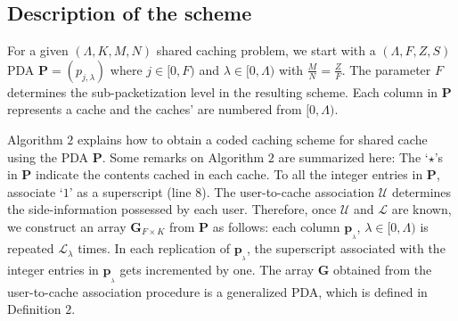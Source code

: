 \documentclass[conference,a4paper,10pt]{IEEEtran}
\begin{document}
\subsection{Description of the scheme} 

For a given $(\Lambda,K,M,N)$ shared caching problem, we start with a $(\Lambda, F, Z, S)$ PDA $\mathbf{P} = (p_{j,\lambda})$ where $j \in [0,F)$ and $\lambda \in [0,\Lambda)$ with $\frac{M}{N}=\frac{Z}{F}$. The parameter $F$ determines the sub-packetization level in the resulting scheme. Each column in $\mathbf{P}$ represents a cache and the caches' are numbered from $[0,\Lambda)$.

Algorithm $2$ explains how to obtain a coded caching scheme for shared cache using the PDA $\mathbf{P}$. Some remarks on Algorithm $2$ are summarized here: The `$\star$'s in $\mathbf{P}$ indicate the contents cached in each cache. To all the integer entries in $\mathbf{P}$, associate `$1$' as a superscript (line $8$). The user-to-cache association $\mathcal{U}$ determines the side-information possessed by each user. Therefore, once $\mathcal{U}$ and $\mathcal{L}$ are known, we construct an array $\mathbf{G}_{F\times K}$ from $\mathbf{P}$ as follows: each column  $\mathbf{p}_{_\lambda}$, $\lambda \in [0,\Lambda)$  is repeated $\mathcal{L}_{\lambda}$ times. In each replication of $\mathbf{p}_{_\lambda}$, the superscript associated with the integer entries in $\mathbf{p}_{_\lambda}$ gets incremented by one. The array $\mathbf{G}$ obtained from the user-to-cache association procedure is a generalized PDA, which is defined in Definition $2$.
\end{document}
